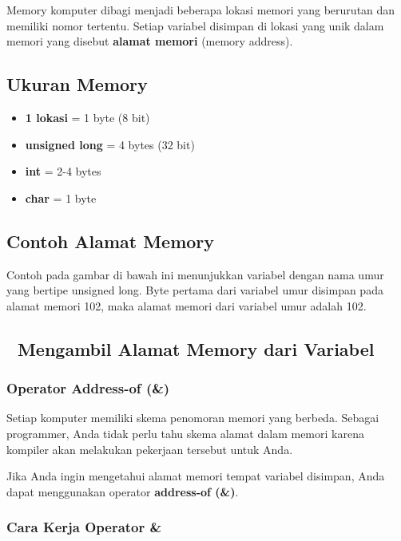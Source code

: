 Memory komputer dibagi menjadi beberapa lokasi memori yang berurutan dan memiliki nomor tertentu. Setiap variabel disimpan di lokasi yang unik dalam memori yang disebut \textbf{alamat memori} (memory address).

\subsection{Ukuran Memory}

\begin{itemize}
\item \textbf{1 lokasi} = 1 byte (8 bit)
\item \textbf{unsigned long} = 4 bytes (32 bit)
\item \textbf{int} = 2-4 bytes
\item \textbf{char} = 1 byte
\end{itemize}

\subsection{Contoh Alamat Memory}

Contoh pada gambar di bawah ini menunjukkan variabel dengan nama umur yang bertipe unsigned long. Byte pertama dari variabel umur disimpan pada alamat memori 102, maka alamat memori dari variabel umur adalah 102.

\subsection{📍 Mengambil Alamat Memory dari Variabel}\label{mengambil-alamat-memory-dari-variabel}

\subsubsection{Operator Address-of (\&)}

Setiap komputer memiliki skema penomoran memori yang berbeda. Sebagai programmer, Anda tidak perlu tahu skema alamat dalam memori karena kompiler akan melakukan pekerjaan tersebut untuk Anda.

Jika Anda ingin mengetahui alamat memori tempat variabel disimpan, Anda dapat menggunakan operator \textbf{address-of (\&)}.

\subsubsection{Cara Kerja Operator \&}

